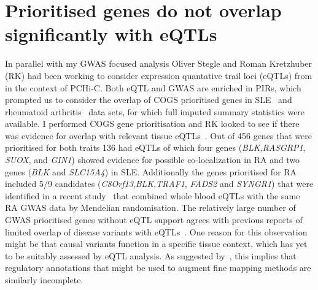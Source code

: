 \documentclass[a4paper,11pt]{report}
\begin{document}




\section{Prioritised genes do not overlap significantly with eQTLs}
In parallel with my GWAS focused analysis Oliver Stegle and Roman Kretzhuber (RK) had been working to consider expression quantative trail loci (eQTLs) from \citet{FairfaxMakinoRadhakrishnanEtAl2012} in the context of PCHi-C. Both eQTL and GWAS are enriched in PIRs, which prompted us to consider the overlap of COGS prioritised genes in SLE~\citep{Bentham2015-di} and rheumatoid arthritis~\citep{Okada2014-um} data sets, for which full imputed summary statistics were available. I performed COGS gene prioritisation and RK looked to see if there was evidence for overlap with relevant tissue eQTLs~\citep{FairfaxMakinoRadhakrishnanEtAl2012}.  Out of 456 genes that were prioritised for both traits 136 had eQTLs  of which four genes (\textit{BLK},\textit{RASGRP1}, \textit{SUOX}, and \textit{GIN1}) showed evidence for possible co-localization in RA and two genes (\textit{BLK} and \textit{SLC15A4}) in SLE. Additionally the genes prioritised for RA included 5/9 candidates (\textit{C8Orf13},\textit{BLK},\textit{TRAF1}, \textit{FADS2} and \textit{SYNGR1}) that were identified in a recent study~\citep{ZhuZhangHuEtAl2016} that combined whole blood eQTLs with the same RA GWAS data by Mendelian randomisation. The relatively large number of GWAS prioritised genes without eQTL support  agrees with previous reports of limited overlap of disease variants with eQTLs~\citep{Guo2015-ka,HuangChenEsparzaEtAl2015}. One reason for this observation might be that  causal variants function in a specific tissue context, which has yet to be suitably assessed by eQTL analysis. As suggested by~\citet{Huang2015-ug}, this implies that regulatory annotations that might be used to augment fine mapping methods are similarly incomplete. 
\end{document}
